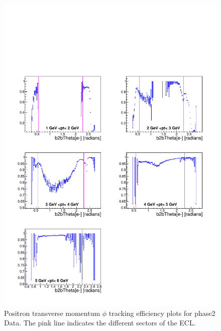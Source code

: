 \documentclass[a4paper,11pt,twosided,final,german,openbib,pdftex,listof=totoc,bibliography=totoc]{scrbook}
\begin{document}
\begin{appendix}
\begin{figure}[!htbp]
	\centering
	\includegraphics[width=\textwidth]{Plots/master/xPtMThetaep_Data}
	\caption[Transverse Momentum $\theta$ Positron Efficiency Phase2 Data]{Positron transverse momentum $\phi$ tracking efficiency plots for phase2 Data. The pink line indicates the different sectors of the ECL.}
	\label{plt:PtMThetaep_Data}
\end{figure}






\end{appendix}
\end{document}
